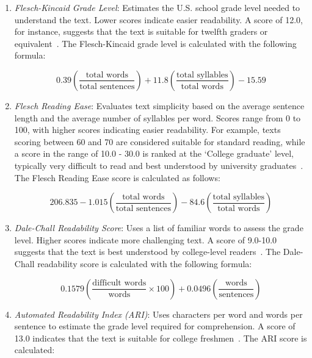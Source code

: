 \begin{enumerate}	
	\item \textit{Flesch-Kincaid Grade Level}: Estimates the U.S. school grade level needed to understand the text. Lower scores indicate easier readability. A score of 12.0, for instance, suggests that the text is suitable for twelfth graders or equivalent~\cite{Farr_1951}. The Flesch-Kincaid grade level is calculated with the following formula: 
	
	{\footnotesize
		\begin{equation}
			0.39 \left(\frac{\text{total words}}{\text{total sentences}}\right) + 11.8 \left(\frac{\text{total syllables}}{\text{total words}}\right) - 15.59
		\end{equation}
	}
	
	\item \textit{Flesch Reading Ease}: Evaluates text simplicity based on the average sentence length and the average number of syllables per word. Scores range from 0 to 100, with higher scores indicating easier readability. For example, texts scoring between 60 and 70 are considered suitable for standard reading, while a score in the range of 10.0 - 30.0 is ranked at the `College graduate' level, typically very difficult to read and best understood by university graduates~\cite{Flesch_1948}. The Flesch Reading Ease score is calculated as follows: 

	{\footnotesize
		\begin{equation}
			\label{Flesch Reading Ease}
			206.835 - 1.015\left(\frac{\text{total words}}{\text{total sentences}}\right) - 84.6 \left(\frac{\text{total syllables}}{\text{total words}}\right)
		\end{equation}
	}

	\item \textit{Dale-Chall Readability Score}: Uses a list of familiar words to assess the grade level. Higher scores indicate more challenging text. A score of 9.0-10.0 suggests that the text is best understood by college-level readers~\cite{Dale_1948_DaleChall}. The Dale-Chall readability score is calculated with the following formula: 
	
	{\footnotesize
	\begin{equation}
		0.1579 \left(\frac{\text{difficult words}}{\text{words}} \times 100\right) + 0.0496 \left(\frac{\text{words}}{\text{sentences}}\right)
	\end{equation}
	}
	\item \textit{Automated Readability Index (ARI)}: Uses characters per word and words per sentence to estimate the grade level required for comprehension. A score of 13.0 indicates that the text is suitable for college freshmen~\cite{Senter_1971_ARI}. The ARI score is calculated: 
	

\end{enumerate}
